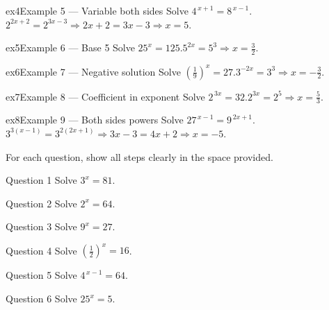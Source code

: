 \documentclass[11pt]{article}
\begin{document}
\begin{example}{ex4}{Example 5 --- Variable both sides}
Solve $4^{\,x+1}=8^{\,x-1}$.\soln $2^{2x+2}=2^{3x-3}\Rightarrow 2x+2=3x-3\Rightarrow x=5$.
\end{example}

\begin{example}{ex5}{Example 6 --- Base 5}
Solve $25^{x}=125$.\soln $5^{2x}=5^3\Rightarrow x=\tfrac32$.
\end{example}

\begin{example}{ex6}{Example 7 --- Negative solution}
Solve $\left(\tfrac19\right)^{x}=27$.\soln $3^{-2x}=3^3\Rightarrow x=-\tfrac32$.
\end{example}

\begin{example}{ex7}{Example 8 --- Coefficient in exponent}
Solve $2^{\,3x}=32$.\soln $2^{3x}=2^5\Rightarrow x=\tfrac53$.
\end{example}

\begin{example}{ex8}{Example 9 --- Both sides powers}
Solve $27^{\,x-1}=9^{\,2x+1}$.\soln $3^{3(x-1)}=3^{2(2x+1)}\Rightarrow 3x-3=4x+2\Rightarrow x=-5$.
\end{example}

\clearpage
{}
For each question, show all steps clearly in the space provided.

\begin{qbox}{Question 1}
Solve $3^{x}=81$.\workspace{2.4cm}
\end{qbox}

\begin{qbox}{Question 2}
Solve $2^{x}=64$.\workspace{2.4cm}
\end{qbox}

\begin{qbox}{Question 3}
Solve $9^{x}=27$.\workspace{2.4cm}
\end{qbox}

\begin{qbox}{Question 4}
Solve $\left(\tfrac12\right)^{x}=16$.\workspace{2.4cm}
\end{qbox}

\begin{qbox}{Question 5}
Solve $4^{\,x-1}=64$.\workspace{2.4cm}
\end{qbox}

\begin{qbox}{Question 6}
Solve $25^{x}=5$.\workspace{2.4cm}
\end{qbox}
\end{document}
